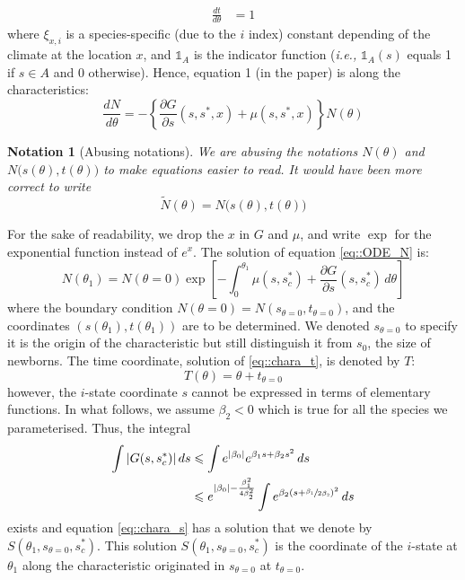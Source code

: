 \documentclass[letterpaper, 12pt]{article}
\newcommand {\ie}{\textit{i.e., }}
\newcommand {\s}{{s}^{*}}
\theoremstyle{theo}
\newtheorem{nota}{Notation}[section]
\begin{document}
\begin{refsection}
\begin{onehalfspace}
\begin{align}
	\frac{dt}{d \theta} &= 1 \label{eq::chara_t}
\end{align}
where $ \xi_{x, i} $ is a species-specific (due to the $ i $ index) constant depending of the climate at the location $ x $, and $ \mathbb{1}_A $ is the indicator function (\ie $ \mathbb{1}_A (s) $ equals 1 if $ s \in A $ and 0 otherwise). Hence, equation 1 (in the paper) is along the characteristics:
\begin{equation}
	\frac{dN}{d\theta} = - \left\{ \frac{\partial G}{\partial s}(s, \s, x) + \mu(s, \s, x) \right\} N(\theta) \label{eq::ODE_N}
\end{equation}
\begin{nota}[Abusing notations]
	We are abusing the notations $ N(\theta) $ and $ N\big( s(\theta), t(\theta) \big) $ to make equations easier to read. It would have been more correct to write
	\[
		\widetilde{N}(\theta) = N \big(s(\theta), t(\theta) \big)
	\]
\end{nota}

For the sake of readability, we drop the $ x $ in $ G $ and $ \mu $, and write $ \exp $ for the exponential function instead of $ e^x $. The solution of equation \eqref{eq::ODE_N} is:
\begin{equation} \label{eq::sol_ODE_N}
	N(\theta_1) = N(\theta = 0) \exp \left[-\int_0^{\theta_1} \mu(s, \s_c) + \frac{\partial G}{\partial s}(s, \s_c) \, d\theta \right]
\end{equation}
where the boundary condition $ N(\theta = 0) = N(s_{\theta = 0}, t_{\theta = 0}) $, and the coordinates $ (s(\theta_1), t(\theta_1)) $ are to be determined. We denoted $ s_{\theta = 0} $ to specify it is the origin of the characteristic but still distinguish it from $ s_0 $, the size of newborns. The time coordinate, solution of \eqref{eq::chara_t}, is denoted by $ T $:
\[
	T(\theta) = \theta + t_{\theta = 0}
\]
however, the $ i $-state coordinate $ s $ cannot be expressed in terms of elementary functions. In what follows, we assume $ \beta_2 < 0 $ which is true for all the species we parameterised. Thus, the integral
\begin{align*}
	\int  | G(s, \s_c) | \, ds &\leqslant \int e^{|\beta_0|} e^{\beta_1 s + \beta_2 s^2} \, ds \\
	&\leqslant e^{|\beta_0| - \frac{\beta_1^2}{4 \beta_2^2}} \int e^{\beta_2(s + \sfrac{\beta_1}{2\beta_2})^2} \, ds
\end{align*}
exists and equation \eqref{eq::chara_s} has a solution that we denote by $ S(\theta_1, s_{\theta = 0}, \s_c) $. This solution $ S(\theta_1, s_{\theta = 0}, \s_c) $ is the coordinate of the $ i $-state at $ \theta_1 $ along the characteristic originated in $ s_{\theta = 0} $ at $ t_{\theta = 0} $.


\end{onehalfspace}
\end{refsection}
\end{document}
